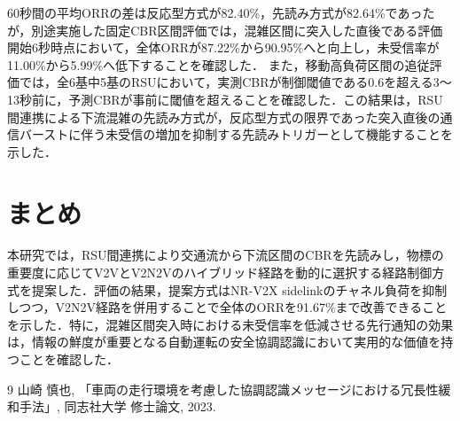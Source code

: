 \documentclass[a4paper,10pt,twocolumn,uplatex]{jsarticle}
\begin{document}
60秒間の平均ORRの差は反応型方式が82.40\%，先読み方式が82.64\%であったが，別途実施した固定CBR区間評価では，混雑区間に突入した直後である評価開始6秒時点において，全体ORRが87.22\%から90.95\%へと向上し，未受信率が11.00\%から5.99\%へ低下することを確認した．
また，移動高負荷区間の追従評価では，全6基中5基のRSUにおいて，実測CBRが制御閾値である0.6を超える3〜13秒前に，予測CBRが事前に閾値を超えることを確認した．この結果は，RSU間連携による下流混雑の先読み方式が，反応型方式の限界であった突入直後の通信バーストに伴う未受信の増加を抑制する先読みトリガーとして機能することを示した．

\section{まとめ}
本研究では，RSU間連携により交通流から下流区間のCBRを先読みし，物標の重要度に応じてV2VとV2N2Vのハイブリッド経路を動的に選択する経路制御方式を提案した．評価の結果，提案方式はNR-V2X sidelinkのチャネル負荷を抑制しつつ，V2N2V経路を併用することで全体のORRを91.67\%まで改善できることを示した．特に，混雑区間突入時における未受信率を低減させる先行通知の効果は，情報の鮮度が重要となる自動運転の安全協調認識において実用的な価値を持つことを確認した．

\begin{thebibliography}{9}
  山崎 慎也, 「車両の走行環境を考慮した協調認識メッセージにおける冗長性緩和手法」, 同志社大学 修士論文, 2023.
\end{thebibliography}
\end{document}

